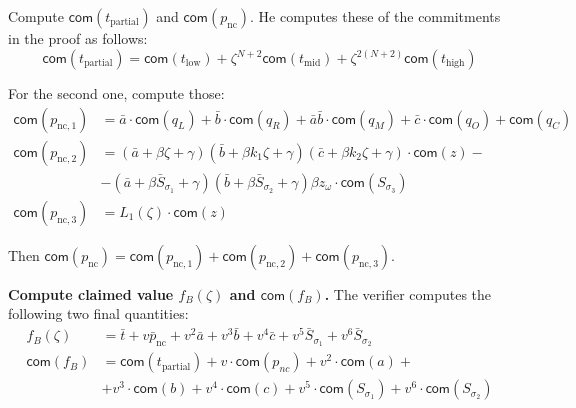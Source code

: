 \documentclass[../lecture-notes-148x210.tex]{subfiles}
\begin{document}
Compute $\mathsf{com}(t_{\text{partial}})$ and
$\mathsf{com}(p_{\text{nc}})$. He computes these of the commitments in the
proof as follows:
\begin{equation*}
    \mathsf{com}(t_{\text{partial}}) = \mathsf{com}(t_{\text{low}}) + \zeta^{N+2}\mathsf{com}(t_{\text{mid}}) + \zeta^{2(N+2)}\mathsf{com}(t_{\text{high}})
\end{equation*}

For the second one, compute those:
\begin{equation*}
    \begin{aligned}
        \mathsf{com}(p_{\text{nc},1}) &= \bar{a}\cdot\mathsf{com}(q_L) + \bar{b} \cdot \mathsf{com}(q_R) + \bar{a}\bar{b} \cdot \mathsf{com}(q_M) + \bar{c} \cdot \mathsf{com}(q_O) + \mathsf{com}(q_C) \\
        \mathsf{com}(p_{\text{nc},2}) &= (\bar{a} + \beta \zeta + \gamma)(\bar{b} + \beta k_1 \zeta + \gamma)(\bar{c} + \beta k_2 \zeta + \gamma) \cdot\mathsf{com}(z) - \\ 
                                      &- (\bar{a} + \beta \bar{S}_{\sigma_1} + \gamma)(\bar{b} + \beta \bar{S}_{\sigma_2} + \gamma)\beta z_{\omega}\cdot \mathsf{com}(S_{\sigma_3}) \\
        \mathsf{com}(p_{\text{nc},3}) &= L_1(\zeta)\cdot\mathsf{com}(z)
    \end{aligned}
\end{equation*}

Then $\mathsf{com}(p_{\text{nc}}) = \mathsf{com}(p_{\text{nc},1}) + \mathsf{com}(p_{\text{nc},2}) + \mathsf{com}(p_{\text{nc},3})$.

\textcolor{blue!60!black}{\textbf{Compute claimed value $f_{B}(\zeta)$ and $\mathsf{com}(f_{B})$.}} The verifier computes 
the following two final quantities:
\begin{align*}
f_{B}(\zeta) &= \bar{t} + v \bar{p}_{\text{nc}} + v^2 \bar{a} + v^3 \bar{b} + v^4 \bar{c} + v^5 \bar{S}_{\sigma_1} + v^6 \bar{S}_{\sigma_2} \\
\mathsf{com}(f_{B}) &= \mathsf{com}(t_{\text{partial}}) + v \cdot \mathsf{com}(p_{nc}) + v^2 \cdot \mathsf{com}(a) + \\
&+ v^3 \cdot \mathsf{com}(b) + v^4 \cdot \mathsf{com}(c) + v^5 \cdot \mathsf{com}(S_{\sigma_1}) + v^6 \cdot \mathsf{com}(S_{\sigma_2})
\end{align*}
\end{document}
